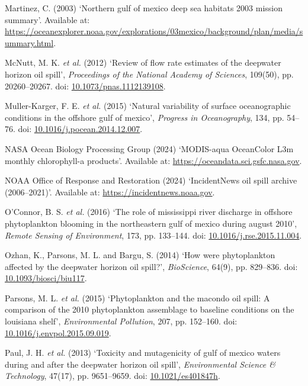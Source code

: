 \documentclass[
  11pt,
]{article}
\newlength{\cslhangindent}
\newenvironment{CSLReferences}[2] %
 {\begin{list}{}{%
  \setlength{\itemindent}{0pt}
  \setlength{\leftmargin}{0pt}
  \setlength{\parsep}{0pt}
  \ifodd #1
   \setlength{\leftmargin}{\cslhangindent}
   \setlength{\itemindent}{-1\cslhangindent}
  \fi
  \setlength{\itemsep}{#2\baselineskip}}}
 {\end{list}}
\begin{document}
\begin{CSLReferences}{0}{1}
Martinez, C. (2003) {`Northern gulf of mexico deep sea habitats 2003
mission summary'}. Available at:
\url{https://oceanexplorer.noaa.gov/explorations/03mexico/background/plan/media/summary.html}.

McNutt, M. K. \emph{et al.} (2012) {`Review of flow rate estimates of
the deepwater horizon oil spill'}, \emph{Proceedings of the National
Academy of Sciences}, 109(50), pp. 20260--20267. doi:
\href{https://doi.org/10.1073/pnas.1112139108}{10.1073/pnas.1112139108}.

Muller-Karger, F. E. \emph{et al.} (2015) {`Natural variability of
surface oceanographic conditions in the offshore gulf of mexico'},
\emph{Progress in Oceanography}, 134, pp. 54--76. doi:
\href{https://doi.org/10.1016/j.pocean.2014.12.007}{10.1016/j.pocean.2014.12.007}.

NASA Ocean Biology Processing Group (2024) {`MODIS-aqua OceanColor L3m
monthly chlorophyll-a products'}. Available at:
\url{https://oceandata.sci.gsfc.nasa.gov}.

NOAA Office of Response and Restoration (2024) {`IncidentNews oil spill
archive (2006--2021)'}. Available at:
\url{https://incidentnews.noaa.gov}.

O'Connor, B. S. \emph{et al.} (2016) {`The role of mississippi river
discharge in offshore phytoplankton blooming in the northeastern gulf of
mexico during august 2010'}, \emph{Remote Sensing of Environment}, 173,
pp. 133--144. doi:
\href{https://doi.org/10.1016/j.rse.2015.11.004}{10.1016/j.rse.2015.11.004}.

Ozhan, K., Parsons, M. L. and Bargu, S. (2014) {`How were phytoplankton
affected by the deepwater horizon oil spill?'}, \emph{BioScience},
64(9), pp. 829--836. doi:
\href{https://doi.org/10.1093/biosci/biu117}{10.1093/biosci/biu117}.

Parsons, M. L. \emph{et al.} (2015) {`Phytoplankton and the macondo oil
spill: A comparison of the 2010 phytoplankton assemblage to baseline
conditions on the louisiana shelf'}, \emph{Environmental Pollution},
207, pp. 152--160. doi:
\href{https://doi.org/10.1016/j.envpol.2015.09.019}{10.1016/j.envpol.2015.09.019}.

Paul, J. H. \emph{et al.} (2013) {`Toxicity and mutagenicity of gulf of
mexico waters during and after the deepwater horizon oil spill'},
\emph{Environmental Science \& Technology}, 47(17), pp. 9651--9659. doi:
\href{https://doi.org/10.1021/es401847h}{10.1021/es401847h}.


\end{CSLReferences}
\end{document}
